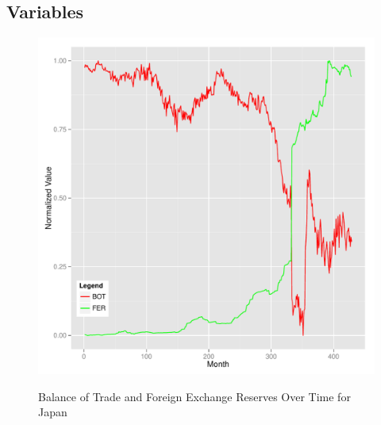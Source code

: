 \documentclass{sig-alternate-05-2015}
\begin{document}

\subsection{Variables}

\begin{figure}
\centering
\caption{Balance of Trade and Foreign Exchange Reserves Over Time for Japan}
\includegraphics[scale=0.45]{japan_plot.pdf}
\label{fig:japan}
\end{figure}
\end{document}
